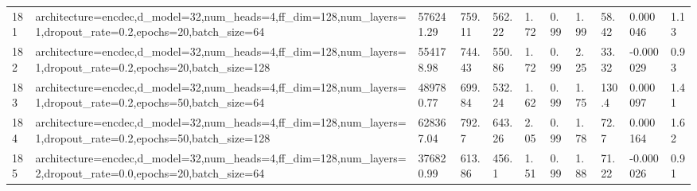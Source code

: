 \begin{longtable}{C{0.8cm} L{2cm} C{1.15cm} C{1.15cm} C{1.15cm} C{1.15cm} C{0.85cm} C{1.25cm} C{1.2cm} C{1.5cm} C{1.0cm}}
181 & architecture=encdec,\newline d\_model=32,\newline num\_heads=4,\newline ff\_dim=128,\newline num\_layers=1,\newline dropout\_rate=0.2,\newline epochs=20,\newline batch\_size=64 & 576241.29 & 759.11 & 562.22 & 1.72 & 0.99 & 1.99 & 58.42 & 0.000046 & 1.13 \\
182 & architecture=encdec,\newline d\_model=32,\newline num\_heads=4,\newline ff\_dim=128,\newline num\_layers=1,\newline dropout\_rate=0.2,\newline epochs=20,\newline batch\_size=128 & 554178.98 & 744.43 & 550.86 & 1.72 & 0.99 & 2.25 & 33.32 & -0.000029 & 0.93 \\
183 & architecture=encdec,\newline d\_model=32,\newline num\_heads=4,\newline ff\_dim=128,\newline num\_layers=1,\newline dropout\_rate=0.2,\newline epochs=50,\newline batch\_size=64 & 489780.77 & 699.84 & 532.24 & 1.62 & 0.99 & 1.75 & 130.4 & 0.000097 & 1.41 \\
184 & architecture=encdec,\newline d\_model=32,\newline num\_heads=4,\newline ff\_dim=128,\newline num\_layers=1,\newline dropout\_rate=0.2,\newline epochs=50,\newline batch\_size=128 & 628367.04 & 792.7 & 643.26 & 2.05 & 0.99 & 1.78 & 72.7 & 0.000164 & 1.62 \\
185 & architecture=encdec,\newline d\_model=32,\newline num\_heads=4,\newline ff\_dim=128,\newline num\_layers=2,\newline dropout\_rate=0.0,\newline epochs=20,\newline batch\_size=64 & 376820.99 & 613.86 & 456.1 & 1.51 & 0.99 & 1.88 & 71.22 & -0.000026 & 0.91 \\

\end{longtable}
